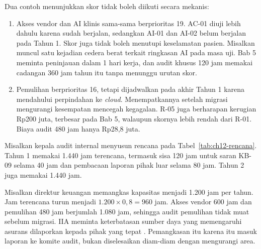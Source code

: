 Dua contoh menunjukkan skor tidak boleh diikuti secara mekanis:
\begin{enumerate}
  \item Akses vendor dan AI klinis sama-sama berprioritas 19. AC-01 diuji lebih dahulu karena
  sudah berjalan, sedangkan AI-01 dan AI-02 belum berjalan pada Tahun 1. Skor juga tidak boleh
  menutupi keselamatan pasien. Misalkan muncul satu kejadian cedera berat terkait ringkasan AI
  pada masa uji. Bab 5 meminta peninjauan dalam 1 hari kerja, dan audit khusus 120 jam memakai
  cadangan 360 jam tahun itu tanpa menunggu urutan skor.
  \item Pemulihan berprioritas 16, tetapi dijadwalkan pada akhir Tahun 1 karena mendahului
  perpindahan ke \textit{cloud}. Menempatkannya setelah migrasi mengurangi kesempatan mencegah kegagalan.
  R-05 juga berharapan kerugian Rp200 juta, terbesar pada Bab 5, walaupun skornya lebih rendah dari
  R-01. Biaya audit 480 jam hanya Rp28,8 juta.
\end{enumerate}

\begin{kasus}[title={Kasus Medikara Health: Rencana Asurans Dua Tahun}]
Misalkan kepala audit internal menyusun rencana pada Tabel~\ref{tab:ch12-rencana}. Tahun 1 memakai
1.440 jam terencana, termasuk sisa 120 jam untuk saran KB-09 selama 40 jam dan pembacaan laporan
pihak luar selama 80 jam. Tahun 2 juga memakai 1.440 jam.

Misalkan direktur keuangan memangkas kapasitas menjadi 1.200 jam per tahun. Jam terencana turun
menjadi $1.200 \times 0{,}8 = 960$ jam. Akses vendor 600 jam dan pemulihan 480 jam berjumlah 1.080
jam, sehingga audit pemulihan tidak muat sebelum migrasi. IIA meminta keterbatasan sumber daya yang
memengaruhi asurans dilaporkan kepada pihak yang tepat \cite{iia-tlm2026}. Pemangkasan itu karena
itu masuk laporan ke komite audit, bukan diselesaikan diam-diam dengan mengurangi area.
\end{kasus}

